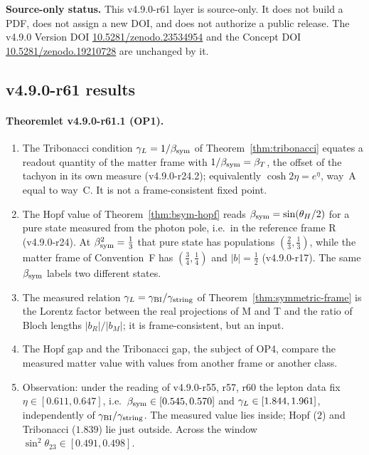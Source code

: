 \noindent\textbf{Source-only status.}
This v4.9.0-r61 layer is source-only.  It does not build a PDF, does not assign a new DOI,
and does not authorize a public release.  The v4.9.0 Version DOI
\href{https://doi.org/10.5281/zenodo.23534954}{10.5281/zenodo.23534954} and the Concept DOI
\href{https://doi.org/10.5281/zenodo.19210728}{10.5281/zenodo.19210728} are unchanged by it.

\subsection*{v4.9.0-r61 results}
\label{subsec:v490-r61-results}

\paragraph{Theoremlet v4.9.0-r61.1 (OP1).}
\begin{enumerate}[leftmargin=2em]
\item[(a)] The Tribonacci condition \(\gamma_L=1/\beta_{\mathrm{sym}}\) of Theorem~\ref{thm:tribonacci} equates a readout quantity of the matter frame with \(1/\beta_{\mathrm{sym}}=\beta_T\), the offset
of the tachyon in its own measure (v4.9.0-r24.2); equivalently \(\cosh2\eta=e^\eta\), way~A equal to way~C.  It is not a frame-consistent fixed point.
\item[(b)] The Hopf value of Theorem~\ref{thm:bsym-hopf} reads \(\beta_{\mathrm{sym}}=\sin(\theta_H/2)\) for a pure state measured from the photon pole, i.e.\ in the reference frame R
(v4.9.0-r24).  At \(\beta_{\mathrm{sym}}^2=\tfrac13\) that pure state has populations \((\tfrac23,\tfrac13)\), while the matter frame of Convention~F has \((\tfrac34,\tfrac14)\) and \(|b|=\tfrac12\)
(v4.9.0-r17).  The same \(\beta_{\mathrm{sym}}\) labels two different states.
\item[(c)] The measured relation \(\gamma_L=\gamma_{\mathrm{BI}}/\gamma_{\mathrm{string}}\) of Theorem~\ref{thm:symmetric-frame} is the Lorentz factor between the real projections of M and T and the ratio of
Bloch lengths \(|b_R|/|b_M|\); it is frame-consistent, but an input.
\item[(d)] The Hopf gap and the Tribonacci gap, the subject of OP4, compare the measured matter value with values from another frame or another class.
\item[(e)] Observation: under the reading of v4.9.0-r55, r57, r60 the lepton data fix \(\eta\in[0.611,0.647]\), i.e.\ \(\beta_{\mathrm{sym}}\in[0.545,0.570]\) and \(\gamma_L\in[1.844,1.961]\),
independently of \(\gamma_{\mathrm{BI}}/\gamma_{\mathrm{string}}\).  The measured value lies inside; Hopf (\(2\)) and Tribonacci (\(1.839\)) lie just outside.  Across the window
\(\sin^2\theta_{23}\in[0.491,0.498]\).
\end{enumerate}

